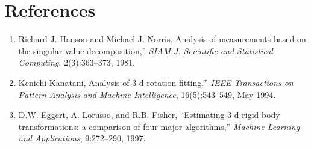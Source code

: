 \documentclass[12pt]{article}
\begin{document}
\section*{References}
\begin{enumerate}
\item Richard J. Hanson and Michael J. Norris, Analysis of measurements based on the singular value decomposition,'' \textit{SIAM J. Scientific and Statistical Computing}, 2(3):363--373, 1981.
  \item Kenichi Kanatani, Analysis of 3-d rotation fitting,'' \textit{IEEE Transactions on Pattern Analysis and Machine Intelligence}, 16(5):543--549, May 1994.
\item D.W. Eggert, A. Lorusso, and R.B. Fisher, ``Estimating 3-d rigid body transformations: a comparison of four major algorithms,'' \textit{Machine Learning and Applications}, 9:272--290, 1997.
\end{enumerate}
\end{document}
